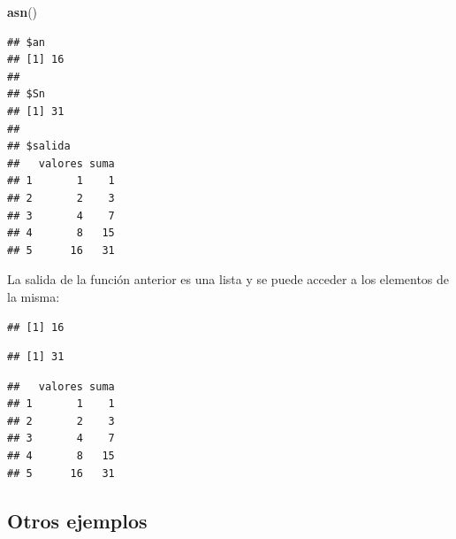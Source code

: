 \documentclass[]{book}
\newenvironment{Shaded}{\begin{snugshade}}{\end{snugshade}}
\newcommand{\KeywordTok}[1]{\textcolor[rgb]{0.13,0.29,0.53}{\textbf{#1}}}
\newcommand{\StringTok}[1]{\textcolor[rgb]{0.31,0.60,0.02}{#1}}
\newcommand{\OperatorTok}[1]{\textcolor[rgb]{0.81,0.36,0.00}{\textbf{#1}}}
\newcommand{\NormalTok}[1]{#1}
\begin{document}
\begin{Shaded}
\begin{Highlighting}[]
\KeywordTok{asn}\NormalTok{()}
\end{Highlighting}
\end{Shaded}

\begin{verbatim}
## $an
## [1] 16
## 
## $Sn
## [1] 31
## 
## $salida
##   valores suma
## 1       1    1
## 2       2    3
## 3       4    7
## 4       8   15
## 5      16   31
\end{verbatim}

La salida de la función anterior es una lista y se puede acceder a los
elementos de la misma:

\begin{Shaded}
\end{Shaded}

\begin{verbatim}
## [1] 16
\end{verbatim}

\begin{Shaded}
\end{Shaded}

\begin{verbatim}
## [1] 31
\end{verbatim}

\begin{Shaded}
\end{Shaded}

\begin{verbatim}
##   valores suma
## 1       1    1
## 2       2    3
## 3       4    7
## 4       8   15
## 5      16   31
\end{verbatim}

\subsection{Otros ejemplos}\label{otros-ejemplos}
\end{document}
